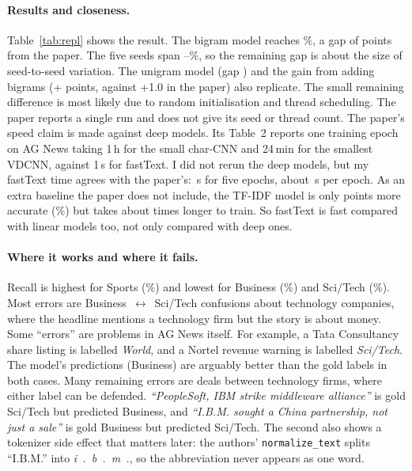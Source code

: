 \documentclass[11pt]{article}
\begin{document}
\paragraph{Results and closeness.} Table~\ref{tab:repl} shows the result. The bigram model
reaches \AGbi\%, a gap of \AGgap{} points from the paper. The five seeds span
\AGbiMin--\AGbiMax\%, so the remaining gap is about the size of seed-to-seed variation. The unigram model (gap \AGuniGap) and the gain
from adding bigrams (+\AGbigramGain{} points, against +1.0 in the paper) also replicate. The
small remaining difference is most likely due to random initialisation and thread
scheduling. The paper reports a single run and does not give its seed or thread count. The
paper's speed claim is made against deep models. Its Table~2 reports one training epoch on AG
News taking 1\,h for the small char-CNN and 24\,min for the smallest VDCNN, against 1\,s for
fastText. I did not rerun the deep models, but my fastText time agrees with the paper's:
\AGbiT\,s for five epochs, about \AGperEpoch\,s per epoch. As an extra baseline the paper does not
include, the TF-IDF model is only \AGtfGap{} points more accurate (\AGtf\%) but takes about
\AGspeedup{} times longer to train. So fastText is fast compared with linear models too, not
only compared with deep ones.

\paragraph{Where it works and where it fails.} Recall is highest for Sports (\AGrecSports\%)
and lowest for Business (\AGrecBusiness\%) and Sci/Tech (\AGrecSciTech\%). Most errors are
Business~$\leftrightarrow$~Sci/Tech confusions about technology companies, where the
headline mentions a technology firm but the story is about money. Some ``errors'' are
problems in AG News itself. For example, a Tata Consultancy share listing is labelled
\emph{World}, and a Nortel revenue warning is labelled \emph{Sci/Tech}. The model's
predictions (Business) are arguably better than the gold labels in both cases. Many
remaining errors are deals between technology firms, where either label can be defended.
\emph{``PeopleSoft, IBM strike middleware alliance''} is gold Sci/Tech but predicted
Business, and \emph{``I.B.M. sought a China partnership, not just a sale''} is gold Business
but predicted Sci/Tech. The second also shows a tokenizer side effect that matters later: the
authors' \texttt{normalize\_text} splits ``I.B.M.'' into \emph{i~.~b~.~m~.}, so the
abbreviation never appears as one word.
\end{document}

